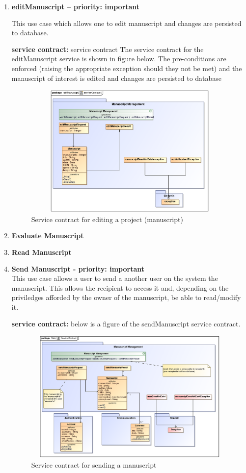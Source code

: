 \documentclass[12pt]{article}
\begin{document}
\begin{enumerate}
\item \textbf{editManuscript – priority: important}\\
\par{This use case which allows one to edit  manuscript and changes are persisted to database.}

\par{\textbf{service contract:} 
service contract The service contract for the editManuscript service is shown in figure below. The pre-conditions are enforced (raising the appropriate exception should they not be met) and the manuscript of interest is edited and changes are persisted to database}

\begin{figure}[h]
\includegraphics[height=250px, width=500px]{epsImages/ManuscriptManagement/editManuscript.eps}
\caption{Service contract for editing a  project (manuscript)}
\end{figure}
\newpage
\item \textbf{Evaluate Manuscript}
\item \textbf{Read Manuscript}
\item \textbf{Send Manuscript - priority: important}\\
This use case allows a user to send a another user on the system the manuscript. This allows the recipient to access it and, depending on the priviledges afforded by the owner of the manuscript, be able to read/modify it.

\textbf{service contract:} below is a figure of the sendManuscript service contract.

\begin{figure}[h]
\includegraphics[height=250px, width=500px]{epsImages/ManuscriptManagement/sendManuscriptServiceContract.eps}
\caption{Service contract for sending a manuscript}
\end{figure}
 
\end{enumerate}
\end{document}
